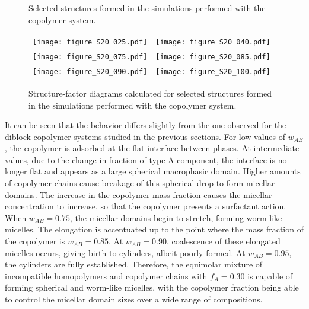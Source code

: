 \documentclass[
journal=mamobx,
manuscript=article,
]{achemso}
\begin{document}
\begin{figure}
\begin{tabular}{C{1.6in}@{}C{1.6in}}
	\end{tabular}
	\caption{Selected structures formed in the simulations performed with the  copolymer system.}
	\label{fig:Figure_17}
\end{figure}


\begin{figure}
	\centering
	\begin{tabular}{C{1.6in}@{}C{1.6in}}
		\texttt{[image: figure\_S20\_025.pdf]} & \texttt{[image: figure\_S20\_040.pdf]} \\
		\texttt{[image: figure\_S20\_075.pdf]} & \texttt{[image: figure\_S20\_085.pdf]} \\		\texttt{[image: figure\_S20\_090.pdf]} & \texttt{[image: figure\_S20\_100.pdf]} \\	
	\end{tabular}
	\caption{Structure-factor diagrams calculated for selected structures formed in the simulations performed with the  copolymer system.}
	\label{fig:Figure_18}
\end{figure}


It can be seen that the behavior differs slightly from the one observed for the diblock copolymer systems studied in the previous sections.
For low values of $w_{AB}$, the copolymer is adsorbed at the flat interface between phases.
At intermediate values, due to the change in fraction of type-A component, the interface is no longer flat and appears as a large spherical macrophasic domain.
Higher amounts of copolymer chains cause breakage of this spherical drop to form micellar domains.
The increase in the copolymer mass fraction causes the micellar concentration to increase, so that the copolymer presents a surfactant action.
When $w_{AB}=0.75$, the micellar domains begin to stretch, forming worm-like micelles.
The elongation is accentuated up to the point where the mass fraction of the copolymer is $w_{AB}=0.85$. At $w_{AB}=0.90$, coalescence of these elongated micelles occurs, giving birth to cylinders, albeit poorly formed.
At $w_{AB}=0.95$, the cylinders are fully established.
Therefore, the equimolar mixture of incompatible homopolymers and copolymer chains with $f_A=0.30$ is capable of forming spherical and worm-like micelles, with the copolymer fraction being able to control the micellar domain sizes over a wide range of compositions.
\end{document}
